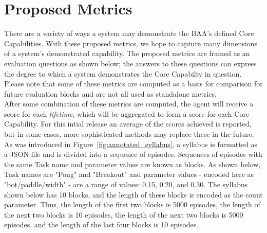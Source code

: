 \chapter{Proposed Metrics}\label{ch:metrics_syllabus}

There are a variety of ways a system may demonstrate the BAA's defined Core Capabilities. With these proposed metrics, we hope to capture many dimensions of a system's demonstrated capability. The proposed metrics are framed as an evaluation questions as shown below; the answers to these questions can express the degree to which a system demonstrates the Core Capabilty in question. Please note that some of these metrics are computed as a basis for comparison for future evaluation blocks and are not all used as standalone metrics. \\[0.1in]

After some combination of these metrics are computed, the agent will receive a score for each \textit{lifetime}, which will be aggregated to form a score for each Core Capability. For this intial release an average of the scores achieved is reported, but in some cases, more sophisticated methods may replace these in the future.\\[0.2in]

As was introduced in Figure~\ref{fig:annotated_syllabus}, a syllabus is formatted as a JSON file and is divided into a sequence of episodes. Sequences of episodes with the same Task name and parameter values are known as blocks. As shown below, Task names are "Pong" and "Breakout" and parameter values - encoded here as "bot/paddle/width" - are a range of values: 0.15, 0.20, and 0.30. The syllabus shown below has 10 blocks, and the length of these blocks is encoded as the count parameter. Thus, the length of the first two blocks is 5000 episodes, the length of the next two blocks is 10 episodes, the length of the next two blocks is 5000 episodes, and the length of the last four blocks is 10 episodes.

